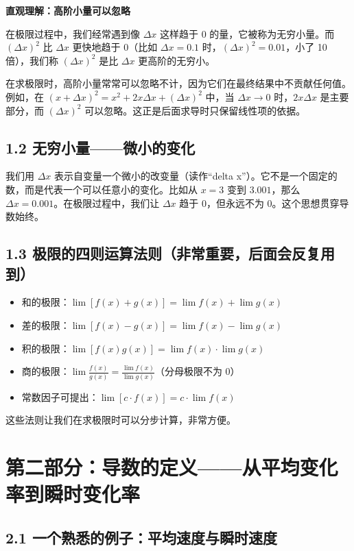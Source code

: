 \documentclass[10pt]{article}
\begin{document}
\textbf{直观理解：高阶小量可以忽略}

在极限过程中，我们经常遇到像 $\Delta x$ 这样趋于 0 的量，它被称为无穷小量。而 $(\Delta x)^2$ 比 $\Delta x$ 更快地趋于 0（比如 $\Delta x=0.1$ 时，$(\Delta x)^2=0.01$，小了 10 倍），我们称 $(\Delta x)^2$ 是比 $\Delta x$ 更高阶的无穷小。

在求极限时，高阶小量常常可以忽略不计，因为它们在最终结果中不贡献任何值。例如，在 $(x+\Delta x)^2 = x^2 + 2x\Delta x + (\Delta x)^2$ 中，当 $\Delta x \to 0$ 时，$2x\Delta x$ 是主要部分，而 $(\Delta x)^2$ 可以忽略。这正是后面求导时只保留线性项的依据。

\subsection*{1.2 无穷小量——微小的变化}

我们用 $\Delta x$ 表示自变量一个微小的改变量（读作“delta x”）。它不是一个固定的数，而是代表一个可以任意小的变化。比如从 $x=3$ 变到 $3.001$，那么 $\Delta x = 0.001$。在极限过程中，我们让 $\Delta x$ 趋于 0，但永远不为 0。这个思想贯穿导数始终。

\subsection*{1.3 极限的四则运算法则（非常重要，后面会反复用到）}

\begin{itemize}
    \item 和的极限：$\lim [f(x)+g(x)] = \lim f(x) + \lim g(x)$
    \item 差的极限：$\lim [f(x)-g(x)] = \lim f(x) - \lim g(x)$
    \item 积的极限：$\lim [f(x)g(x)] = \lim f(x) \cdot \lim g(x)$
    \item 商的极限：$\lim \frac{f(x)}{g(x)} = \frac{\lim f(x)}{\lim g(x)}$（分母极限不为 0）
    \item 常数因子可提出：$\lim [c \cdot f(x)] = c \cdot \lim f(x)$
\end{itemize}

这些法则让我们在求极限时可以分步计算，非常方便。

\section*{第二部分：导数的定义——从平均变化率到瞬时变化率}

\subsection*{2.1 一个熟悉的例子：平均速度与瞬时速度}
\end{document}
